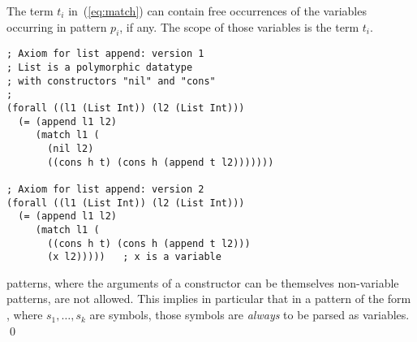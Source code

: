 The term $t_i$ in~(\ref{eq:match}) can contain free occurrences 
of the variables occurring in pattern $p_i$, if any.
The scope of those variables is the term $t_i$.

\begin{lstlisting}[linewidth=29em]
; Axiom for list append: version 1
; List is a polymorphic datatype 
; with constructors "nil" and "cons"
;
(forall ((l1 (List Int)) (l2 (List Int)))
  (= (append l1 l2)
     (match l1 (
       (nil l2)
       ((cons h t) (cons h (append t l2)))))))

; Axiom for list append: version 2
(forall ((l1 (List Int)) (l2 (List Int)))
  (= (append l1 l2)
     (match l1 (
       ((cons h t) (cons h (append t l2)))
       (x l2)))))   ; x is a variable
\end{lstlisting}

\begin{remark}
 patterns, where the arguments of a constructor can be themselves
non-variable patterns, are not allowed.
This implies in particular that in a pattern of the form ,
where $s_1, \ldots, s_k$ are symbols, those symbols are \emph{always} to be parsed as variables.
\qed
\end{remark}

